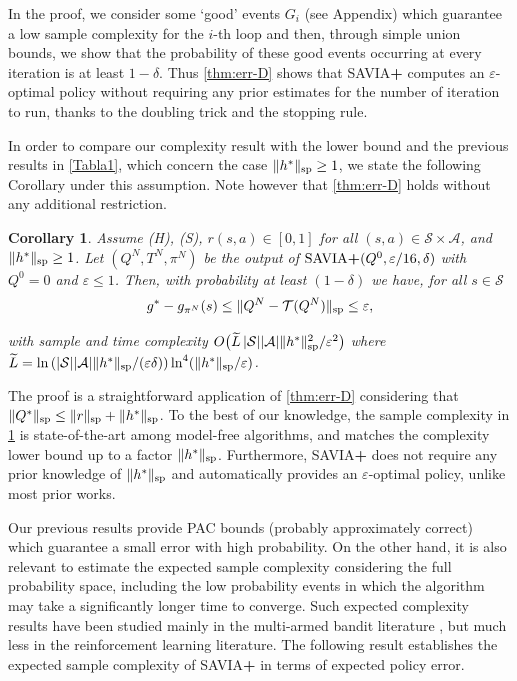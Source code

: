 \documentclass{article}
\newcommand{\cA}{\mathcal{A}}
\newcommand{\cS}{\mathcal{S}}
\newcommand{\T}{\mathcal{T}}
\renewcommand{\sp}[1]{\|{#1}\|_\text{\rm sp}}
\newcommand{\R}{r}
\theoremstyle{plain}
\newtheorem{corollary}[theorem]{Corollary}
\theoremstyle{definition}
\theoremstyle{remark}
\begin{document}
In the proof, we consider some `good' events $G_i$ (see Appendix) which guarantee a low sample complexity for the $i$-th loop and then, through simple union bounds, we show that the probability of these good events occurring at every iteration is at least $1-\delta$. Thus \cref{thm:err-D} shows that \mbox{\rm SAVIA\textbf{+}} computes an $\varepsilon$-optimal policy without requiring any prior estimates for the number of iteration to run, thanks to the doubling trick and the stopping rule. 

In order to compare our complexity result with the lower bound  and the previous results in \cref{Tabla1}, which concern the case $\sp{h^{*}}\ge 1$, we state the following Corollary under this assumption. 
Note however that \cref{thm:err-D} holds without any additional restriction.

\begin{corollary}\label{cor:err}
Assume \mbox{\sc (H)}, \mbox{\sc (S)}, $r(s,a) \in[0,1]$ for all $(s,a)\in\cS\times\cA$, and $\sp{h^{*}}\ge 1$. Let $(Q^N,T^N,\pi^N)$ be the output of $\mbox{\rm SAVIA\textbf{+}}(Q^0,\varepsilon/16,\delta)$
with $Q^0=0$ and $\varepsilon\leq 1$. Then, with probability at least $(1-\delta)$ we have,  for all $s\in\cS$
\vspace{-1ex}
  $$g^*-g_{\pi^N}(s)\leq \sp{Q^N-\T(Q^N)} \leq \varepsilon,$$
 
  \vspace{-2ex}
   with sample and time complexity ${O}\big(\widetilde{L}\,|\cS||\cA|\sp{h^*}^{2}/\varepsilon^{2}\big)$
   where $\widetilde{L}= \ln \left(|\cS||\cA|\sp{h^*}/(\varepsilon \delta)\right)\ln^4 (\sp{h^*}/\varepsilon)$.
\end{corollary}
The proof is a straightforward application of  \cref{thm:err-D} considering that $\sp{Q^*}\leq\sp{\R}+\sp{h^*}$. 
To the best of our knowledge, the sample complexity in \cref{cor:err} is state-of-the-art among model-free algorithms, and matches the complexity lower bound up to a factor $\sp{h^*}$. Furthermore, \mbox{\rm SAVIA\textbf{+}} does not require any prior knowledge of $\sp{h^*}$ and automatically provides an $\varepsilon$-optimal policy, unlike most prior works. 


Our previous results provide PAC bounds (probably approximately correct)  which guarantee a small error  with high probability. On the other hand, it is also relevant to  estimate the expected sample complexity considering the full probability space, including the low probability events in which the algorithm may take a significantly longer time to converge. Such expected complexity results have been studied mainly in the multi-armed bandit literature \citep{katz2020true, mason2020finding, jourdan2023varepsilon}, but much less in the reinforcement learning literature.
The following result establishes the expected sample complexity of \mbox{\rm SAVIA\textbf{+}} in terms of expected policy error.
\end{document}
